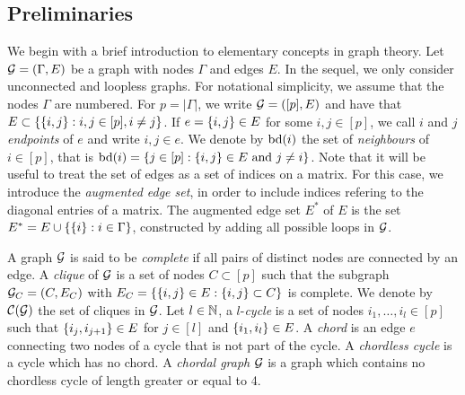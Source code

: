 \subsection{Preliminaries} \label{sec-prelim}

We begin with a brief introduction to elementary concepts in graph theory. Let ${\mathcal{G}} = (\Gamma, E)$ be a graph with nodes $\Gamma$ and edges $E$. In the sequel, we only consider unconnected and loopless graphs. For notational simplicity, we assume that the nodes $\Gamma$ are numbered. For $p = |\Gamma|$, we write ${\mathcal{G}} = ([p], E)$ and have that $E \subset {\left\{ {\left\{i, j\right\}} : i, j \in [p], i \neq j \right\}}$. If $e = {\left\{i, j\right\}} \in E$ for some $i, j \in [p]$, we call $i$ and $j$ \textit{endpoints} of $e$ and write $i, j \in e$.  We denote by ${\textrm{bd}}(i)$ the set of \textit{neighbours} of $i \in [p]$, that is ${\textrm{bd}}(i) = {\left\{ j \in [p] : {\left\{i, j\right\}} \in E {\textrm{ and }} j \neq i\right\}}$.  Note that it will be useful to treat the set of edges as a set of indices on a matrix. For this case, we introduce the \textit{augmented edge set}, in order to include indices refering to the diagonal entries of a matrix. The augmented edge set $E^*$ of $E$ is the set $E^* = E \cup {\left\{ {\left\{i\right\}} : i \in \Gamma \right\}}$, constructed by adding all possible loops in ${\mathcal{G}}$.

A graph ${\mathcal{G}}$ is said to be \textit{complete} if all pairs of distinct nodes are connected by an edge. A \textit{clique} of ${\mathcal{G}}$ is a set of nodes $C \subset [p]$ such that the subgraph ${\mathcal{G}}_C = (C, E_C)$ with $E_C = {\left\{ {\left\{i, j\right\}} \in E : {\left\{i, j\right\}} \subset C \right\}}$ is complete. We denote by ${\mathcal{C}}({\mathcal{G}})$ the set of cliques in ${\mathcal{G}}$. Let $l \in \mathbb{N}$, a $l$-\textit{cycle} is a set of nodes $i_1, \ldots, i_l \in [p]$ such that ${\left\{i_j, i_{j+1}\right\}} \in E$ for $j \in [l]$ and ${\left\{i_1, i_l\right\}} \in E$. A \textit{chord} is an edge $e$ connecting two nodes of a cycle that is not part of the cycle. A \textit{chordless cycle} is a cycle which has no chord. A \textit{chordal graph} ${\mathcal{G}}$ is a graph which contains no chordless cycle of length greater or equal to 4.


